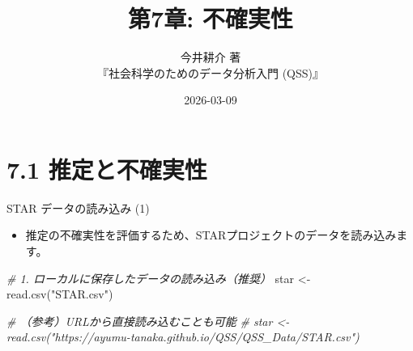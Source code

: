 \documentclass[
  ignorenonframetext,
]{beamer}
\title{第7章: 不確実性}
\subtitle{今井耕介 著\\
『社会科学のためのデータ分析入門 (QSS)』}
\author{}
\date{\vspace{-2.5em}2026-03-09}
\newenvironment{Shaded}{\begin{snugshade}}{\end{snugshade}}
\newcommand{\CommentTok}[1]{\textcolor[rgb]{0.56,0.35,0.01}{\textit{#1}}}
\newcommand{\FunctionTok}[1]{\textcolor[rgb]{0.00,0.00,0.00}{#1}}
\newcommand{\NormalTok}[1]{#1}
\newcommand{\OtherTok}[1]{\textcolor[rgb]{0.56,0.35,0.01}{#1}}
\newcommand{\StringTok}[1]{\textcolor[rgb]{0.31,0.60,0.02}{#1}}
\providecommand{\tightlist}{%
  \setlength{\itemsep}{0pt}\setlength{\parskip}{0pt}}
\begin{document}
\frame{\titlepage}

\hypertarget{ux63a8ux5b9aux3068ux4e0dux78baux5b9fux6027}{%
\section{7.1
推定と不確実性}\label{ux63a8ux5b9aux3068ux4e0dux78baux5b9fux6027}}

\begin{frame}[fragile]{STAR データの読み込み (1)}
\protect\hypertarget{star-ux30c7ux30fcux30bfux306eux8aadux307fux8fbcux307f-1}{}
\begin{itemize}
\tightlist
\item
  推定の不確実性を評価するため、STARプロジェクトのデータを読み込みます。
\end{itemize}

\scriptsize

\begin{Shaded}
\begin{Highlighting}[]
\CommentTok{\# 1. ローカルに保存したデータの読み込み（推奨）}
\NormalTok{star }\OtherTok{\textless{}{-}} \FunctionTok{read.csv}\NormalTok{(}\StringTok{"STAR.csv"}\NormalTok{)}

\CommentTok{\# （参考）URLから直接読み込むことも可能}
\CommentTok{\# star \textless{}{-} read.csv("https://ayumu{-}tanaka.github.io/QSS/QSS\_Data/STAR.csv")}
\end{Highlighting}
\end{Shaded}

\normalsize
\end{frame}
\end{document}
